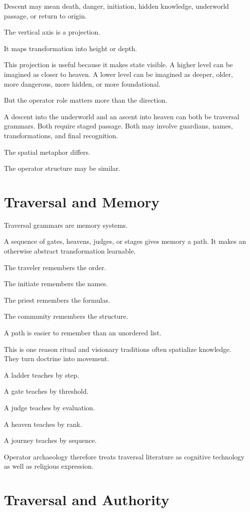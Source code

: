 \documentclass[11pt]{book}
\begin{document}
Descent may mean death, danger, initiation, hidden knowledge, underworld passage, or return to origin.

The vertical axis is a projection.

It maps transformation into height or depth.

This projection is useful because it makes state visible. A higher level can be imagined as closer to heaven. A lower level can be imagined as deeper, older, more dangerous, more hidden, or more foundational.

But the operator role matters more than the direction.

A descent into the underworld and an ascent into heaven can both be traversal grammars. Both require staged passage. Both may involve guardians, names, transformations, and final recognition.

The spatial metaphor differs.

The operator structure may be similar.

\section{Traversal and Memory}

Traversal grammars are memory systems.

A sequence of gates, heavens, judges, or stages gives memory a path. It makes an otherwise abstract transformation learnable.

The traveler remembers the order.

The initiate remembers the names.

The priest remembers the formulas.

The community remembers the structure.

A path is easier to remember than an unordered list.

This is one reason ritual and visionary traditions often spatialize knowledge. They turn doctrine into movement.

A ladder teaches by step.

A gate teaches by threshold.

A judge teaches by evaluation.

A heaven teaches by rank.

A journey teaches by sequence.

Operator archaeology therefore treats traversal literature as cognitive technology as well as religious expression.

\section{Traversal and Authority}
\end{document}
